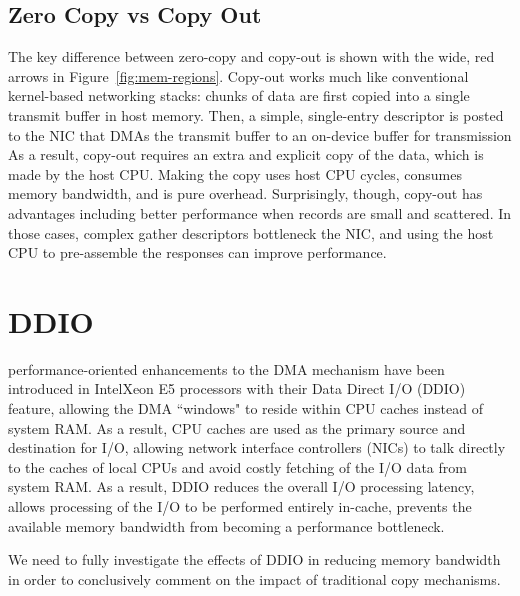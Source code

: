 \subsection{Zero Copy vs Copy Out}
The key difference between zero-copy and copy-out is shown with the wide, red
arrows in Figure~\ref{fig:mem-regions}. Copy-out works much like conventional
kernel-based networking stacks: chunks of data are first copied into a single
transmit buffer in host memory. Then, a simple, single-entry descriptor is
posted to the NIC that DMAs the transmit buffer to an on-device buffer for transmission
As a result, copy-out requires an extra and explicit copy of the data, which is made
by the host CPU.  Making the copy uses host CPU cycles, consumes memory
bandwidth, and is pure overhead. Surprisingly, though, copy-out has
advantages including better performance when
records are small and scattered.  In those cases, complex gather descriptors
bottleneck the NIC, and using the host CPU to pre-assemble the responses can
improve performance.



\section{DDIO}
performance-oriented enhancements to the DMA mechanism have been introduced in 
Intel\textregistered Xeon E5 processors with their Data Direct I/O (DDIO)~\cite{ddio} feature,
allowing the DMA ``windows" to reside within CPU caches instead of system RAM. As a result,
CPU caches are used as the primary source and destination for I/O, 
allowing network interface controllers (NICs) to talk directly to the caches of local CPUs
and avoid costly fetching of the I/O data from system RAM. As a result,
DDIO reduces the overall I/O processing latency, allows processing of the I/O 
to be performed entirely in-cache, prevents the  available memory bandwidth from becoming a performance bottleneck.

We need to fully investigate the effects of DDIO in reducing memory bandwidth 
in order to conclusively comment on the impact of traditional copy mechanisms.



